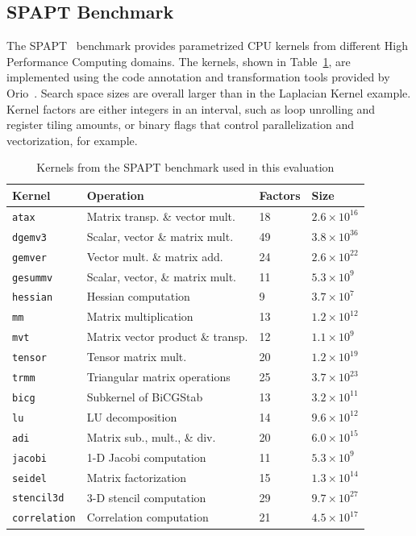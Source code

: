 \documentclass[conference]{IEEEtran}
\begin{document}
\subsection{SPAPT Benchmark}
\label{sec:orgee6f0b4}
The SPAPT~\cite{balaprakash2012spapt} benchmark provides parametrized CPU
kernels from different High Performance Computing domains. The kernels, shown in
Table~\ref{tab:orgeaf2cfd}, are implemented using the code
annotation and transformation tools provided by
Orio~\cite{hartono2009annotation}. Search space sizes are overall larger
than in the Laplacian Kernel example. Kernel factors are either integers in an
interval, such as loop unrolling and register tiling amounts, or binary flags
that control parallelization and vectorization, for example.

\begin{table}[ht]
\caption{\label{tab:orgeaf2cfd}
Kernels from the SPAPT benchmark used in this evaluation}
\centering
\scriptsize
\begin{tabular}{llll}
\toprule
Kernel & Operation & Factors & Size\\
\midrule
\texttt{atax} & Matrix transp. \& vector mult. & 18 & \(2.6 \times 10^{16}\)\\
\texttt{dgemv3} & Scalar, vector \& matrix mult. & 49 & \(3.8 \times 10^{36}\)\\
\texttt{gemver} & Vector mult. \& matrix add. & 24 & \(2.6 \times 10^{22}\)\\
\texttt{gesummv} & Scalar, vector, \& matrix mult. & 11 & \(5.3 \times 10^{9}\)\\
\texttt{hessian} & Hessian computation & 9 & \(3.7 \times 10^{7}\)\\
\texttt{mm} & Matrix multiplication & 13 & \(1.2 \times 10^{12}\)\\
\texttt{mvt} & Matrix vector product \& transp. & 12 & \(1.1 \times 10^{9}\)\\
\texttt{tensor} & Tensor matrix mult. & 20 & \(1.2 \times 10^{19}\)\\
\texttt{trmm} & Triangular matrix operations & 25 & \(3.7 \times 10^{23}\)\\
\texttt{bicg} & Subkernel of BiCGStab & 13 & \(3.2 \times 10^{11}\)\\
\texttt{lu} & LU decomposition & 14 & \(9.6 \times 10^{12}\)\\
\texttt{adi} & Matrix sub., mult., \& div. & 20 & \(6.0 \times 10^{15}\)\\
\texttt{jacobi} & 1-D Jacobi computation & 11 & \(5.3 \times 10^{9}\)\\
\texttt{seidel} & Matrix factorization & 15 & \(1.3 \times 10^{14}\)\\
\texttt{stencil3d} & 3-D stencil computation & 29 & \(9.7 \times 10^{27}\)\\
\texttt{correlation} & Correlation computation & 21 & \(4.5 \times 10^{17}\)\\
\bottomrule
\end{tabular}
\end{table}
\end{document}
